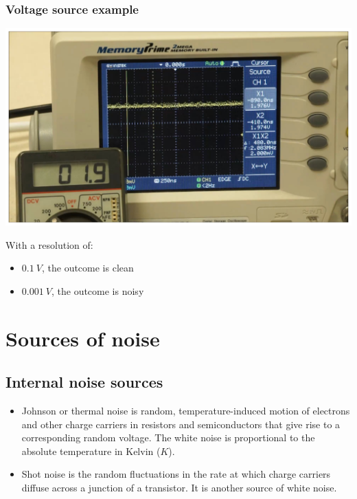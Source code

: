 \documentclass[11pt]{article}
\begin{document}
\subsubsection{Voltage source example}
\label{sec:orgcc3c86d}
\begin{center}
\includegraphics[width=.9\linewidth]{./images/voltage-source-signal.png}
\end{center}

With a resolution of:
\begin{itemize}
\item \(\qty{0.1}{V}\), the outcome is clean
\item \(\qty{0.001}{V}\), the outcome is noisy
\end{itemize}

\section{Sources of noise}
\label{sec:org47afe01}

\subsection{Internal noise sources}
\label{sec:org9b06a86}
\begin{itemize}
\item Johnson or thermal noise is random, temperature-induced motion of electrons and other charge carriers in resistors and semiconductors that give rise to a corresponding random voltage. The white noise is proportional to the absolute temperature in Kelvin (\(\unit{K}\)).
\item Shot noise is the random fluctuations in the rate at which charge carriers diffuse across a junction of a transistor. It is another source of white noise.
\end{itemize}

 \newpage
\end{document}
